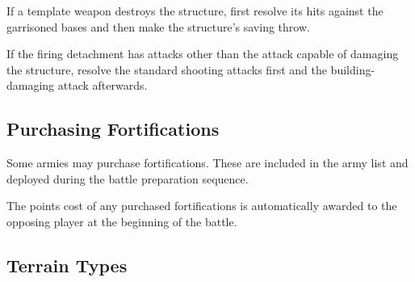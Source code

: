 If a template weapon destroys the structure, first resolve its hits against the garrisoned bases and then make the structure's saving throw.

If the firing detachment has attacks other than the attack capable of damaging the structure, resolve the standard shooting attacks first and the building-damaging attack afterwards.

\subsection{Purchasing Fortifications}

Some armies may purchase fortifications. These are included in the army list and deployed during the battle preparation sequence.

The points cost of any purchased fortifications is automatically awarded to the opposing player at the beginning of the battle.

\subsection{Terrain Types}

